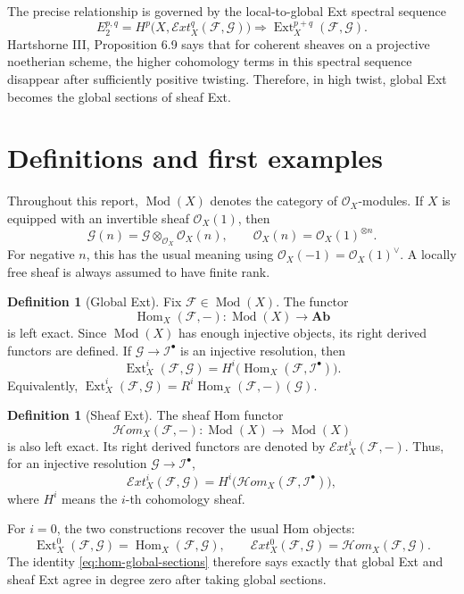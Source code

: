 \documentclass[11pt,a4paper]{article}
\numberwithin{equation}{section}
\theoremstyle{plain}
\theoremstyle{definition}
\newtheorem{definition}[theorem]{Definition}
\theoremstyle{remark}
\newcommand{\OO}{\mathcal O}
\newcommand{\F}{\mathcal F}
\newcommand{\G}{\mathcal G}
\newcommand{\I}{\mathcal I}
\DeclareMathOperator{\Ext}{Ext}
\DeclareMathOperator{\Hom}{Hom}
\newcommand{\sExt}{\mathcal{E}\!xt}
\newcommand{\sHom}{\mathcal{H}\!om}
\newcommand{\Mod}{\operatorname{Mod}}
\begin{document}
The precise relationship is governed by the local-to-global Ext spectral sequence
\begin{equation}\label{eq:local-to-global-intro}
  E_2^{p,q}=H^p\bigl(X,\sExt_X^q(\F,\G)\bigr)
  \Longrightarrow
  \Ext_X^{p+q}(\F,\G).
\end{equation}
Hartshorne III, Proposition 6.9 says that for coherent sheaves on a projective noetherian scheme, the higher cohomology terms in this spectral sequence disappear after sufficiently positive twisting.  Therefore, in high twist, global Ext becomes the global sections of sheaf Ext.

\section{Definitions and first examples}

Throughout this report, \(\Mod(X)\) denotes the category of \(\OO_X\)-modules.  If \(X\) is equipped with an invertible sheaf \(\OO_X(1)\), then
\[
  \G(n)=\G\otimes_{\OO_X}\OO_X(n),
  \qquad
  \OO_X(n)=\OO_X(1)^{\otimes n}.
\]
For negative \(n\), this has the usual meaning using \(\OO_X(-1)=\OO_X(1)^\vee\).  A locally free sheaf is always assumed to have finite rank.

\begin{definition}[Global Ext]
Fix \(\F\in \Mod(X)\).  The functor
\[
  \Hom_X(\F,-):\Mod(X)\longrightarrow \mathbf{Ab}
\]
is left exact.  Since \(\Mod(X)\) has enough injective objects, its right derived functors are defined.  If \(\G\to \I^\bullet\) is an injective resolution, then
\[
  \Ext_X^i(\F,\G)=H^i\bigl(\Hom_X(\F,\I^\bullet)\bigr).
\]
Equivalently, \(\Ext_X^i(\F,\G)=R^i\Hom_X(\F,-)(\G)\).
\end{definition}

\begin{definition}[Sheaf Ext]
The sheaf Hom functor
\[
  \sHom_X(\F,-):\Mod(X)\longrightarrow \Mod(X)
\]
is also left exact.  Its right derived functors are denoted by \(\sExt_X^i(\F,-)\).  Thus, for an injective resolution \(\G\to\I^\bullet\),
\[
  \sExt_X^i(\F,\G)
  =
  H^i\bigl(\sHom_X(\F,\I^\bullet)\bigr),
\]
where \(H^i\) means the \(i\)-th cohomology sheaf.
\end{definition}

For \(i=0\), the two constructions recover the usual Hom objects:
\[
  \Ext_X^0(\F,\G)=\Hom_X(\F,\G),
  \qquad
  \sExt_X^0(\F,\G)=\sHom_X(\F,\G).
\]
The identity \eqref{eq:hom-global-sections} therefore says exactly that global Ext and sheaf Ext agree in degree zero after taking global sections.
\end{document}
